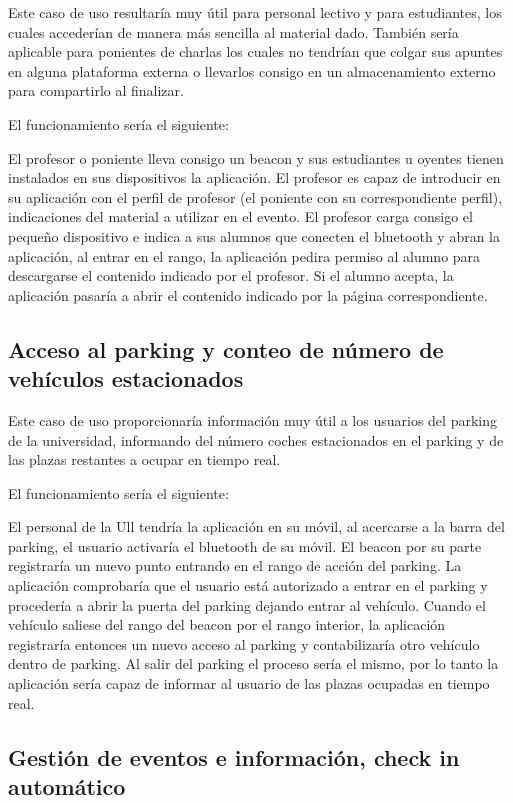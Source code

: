Este caso de uso resultaría muy útil para personal lectivo y para estudiantes, los cuales accederían de manera más sencilla al material dado. También sería aplicable para ponientes de charlas los cuales no tendrían que colgar sus apuntes en alguna plataforma externa o llevarlos consigo en  un almacenamiento externo para compartirlo al finalizar.

El funcionamiento sería el siguiente: 

El profesor o poniente lleva consigo un beacon y sus estudiantes u oyentes tienen instalados en sus dispositivos la aplicación. El profesor es capaz de introducir en su aplicación con el perfil de profesor (el poniente con su correspondiente perfil), indicaciones del material a utilizar en el evento. El profesor carga consigo el pequeño dispositivo e indica a sus alumnos que conecten el bluetooth y abran la aplicación, al entrar en el rango, la aplicación pedira permiso al alumno para descargarse el contenido indicado por el profesor. Si el alumno acepta, la aplicación pasaría a abrir  el contenido indicado por la página correspondiente.


\subsection{Acceso al parking y conteo de número de vehículos estacionados}


Este caso de uso proporcionaría información muy útil a los usuarios del parking de la universidad, informando del número coches estacionados en el parking y de las plazas restantes a ocupar en tiempo real.

El funcionamiento sería el siguiente: 

El personal de la Ull tendría la aplicación en su móvil, al acercarse a la barra del parking, el usuario activaría el bluetooth de su móvil. El beacon por su parte registraría un nuevo punto entrando en el rango de acción del parking. La aplicación comprobaría que el usuario está autorizado a entrar en el parking y procedería a abrir la puerta del parking dejando entrar al vehículo. Cuando el vehículo saliese del rango del beacon por el rango interior, la aplicación registraría entonces un nuevo acceso al parking y contabilizaría otro vehículo dentro de parking. Al salir del parking el proceso sería el mismo, por lo tanto la aplicación sería capaz de informar al usuario de las plazas ocupadas en tiempo real.


\subsection{Gestión de eventos e información, check in automático}

